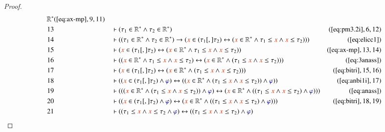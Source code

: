 \begin{proof}
\begin{align}
      \mathbb{R}^{\ast}&(\mbox{\ref{eq:ax-mp}},9,11)\notag
  \\ 13 &&  & \vdash ( \tau_1 \in \mathbb{R}^{\ast} \wedge \tau_2 \in
      \mathbb{R}^{\ast} )&(\mbox{\ref{eq:pm3.2i}},6,12)\notag
  \\ 14 &&  & \vdash ( ( \tau_1 \in \mathbb{R}^{\ast} \wedge \tau_2 \in
      \mathbb{R}^{\ast} ) \rightarrow ( \msc{x} \in ( \tau_1
      [,] \tau_2 ) \leftrightarrow ( \msc{x} \in
      \mathbb{R}^{\ast} \wedge \tau_1 \le \msc{x} \wedge
      \msc{x} \le \tau_2 ) )
      )&(\mbox{\ref{eq:elicc1}})\notag
  \\ 15 &&  & \vdash ( \msc{x} \in ( \tau_1 [,] \tau_2 ) \leftrightarrow (
      \msc{x} \in \mathbb{R}^{\ast} \wedge \tau_1 \le \msc{x}
      \wedge \msc{x} \le \tau_2 )
      )&(\mbox{\ref{eq:ax-mp}},13,14)\notag
  \\ 16 &&  & \vdash ( ( \msc{x} \in \mathbb{R}^{\ast} \wedge \tau_1 \le \msc{x}
      \wedge \msc{x} \le \tau_2 ) \leftrightarrow ( \msc{x}
      \in \mathbb{R}^{\ast} \wedge ( \tau_1 \le \msc{x} \wedge
      \msc{x} \le \tau_2 ) )
      )&(\mbox{\ref{eq:3anass}})\notag
  \\ 17 &&  & \vdash ( \msc{x} \in ( \tau_1 [,] \tau_2 ) \leftrightarrow (
      \msc{x} \in \mathbb{R}^{\ast} \wedge ( \tau_1 \le
      \msc{x} \wedge \msc{x} \le \tau_2 ) )
      )&(\mbox{\ref{eq:bitri}},15,16)\notag
  \\ 18 &&  & \vdash ( ( \msc{x} \in ( \tau_1 [,] \tau_2 ) \wedge \mw{\varphi}
      ) \leftrightarrow ( ( \msc{x} \in \mathbb{R}^{\ast}
      \wedge ( \tau_1 \le \msc{x} \wedge \msc{x} \le \tau_2
      ) ) \wedge \mw{\varphi} )
      )&(\mbox{\ref{eq:anbi1i}},17)\notag
  \\ 19 &&  & \vdash ( ( ( \msc{x} \in \mathbb{R}^{\ast} \wedge ( \tau_1 \le
      \msc{x} \wedge \msc{x} \le \tau_2 ) ) \wedge
      \mw{\varphi} ) \leftrightarrow ( \msc{x} \in
      \mathbb{R}^{\ast} \wedge ( ( \tau_1 \le \msc{x} \wedge
      \msc{x} \le \tau_2 ) \wedge \mw{\varphi} ) )
      )&(\mbox{\ref{eq:anass}})\notag
  \\ 20 &&  & \vdash ( ( \msc{x} \in ( \tau_1 [,] \tau_2 ) \wedge \mw{\varphi}
      ) \leftrightarrow ( \msc{x} \in \mathbb{R}^{\ast} \wedge
      ( ( \tau_1 \le \msc{x} \wedge \msc{x} \le \tau_2 )
      \wedge \mw{\varphi} ) )
      )&(\mbox{\ref{eq:bitri}},18,19)\notag
  \\ 21 &&  & \vdash ( ( \tau_1 \le \msc{x} \wedge \msc{x} \le \tau_2 \wedge
      \mw{\varphi} ) \leftrightarrow ( ( \tau_1 \le \msc{x}
      \wedge \msc{x} \le \tau_2 ) \wedge \mw{\varphi} )

\end{align}
\end{proof}
